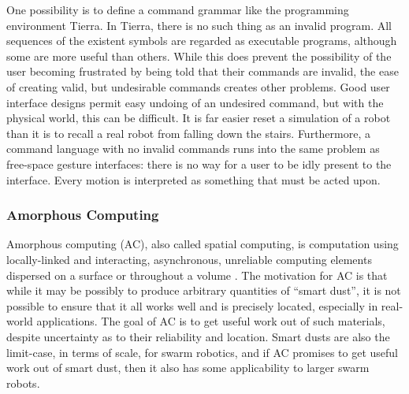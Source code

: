 \documentclass[]{article}
\begin{document}
One possibility is to define a command grammar like the programming environment Tierra. \cite{ray1991approach}
In Tierra, there is no such thing as an invalid program. 
All sequences of the existent symbols are regarded as executable programs, although some are more useful than others. 
While this does prevent the possibility of the user becoming frustrated by being told that their commands are invalid, the ease of creating valid, but undesirable commands creates other problems. 
Good user interface designs permit easy undoing of an undesired command, but with the physical world, this can be difficult. 
It is far easier reset a simulation of a robot than it is to recall a real robot from falling down the stairs. 
Furthermore, a command language with no invalid commands runs into the same problem as free-space gesture interfaces: there is no way for a user to be idly present to the interface.
Every motion is interpreted as something that must be acted upon. 

\subsubsection{Amorphous Computing}

Amorphous computing (AC), also called spatial computing, is computation using locally-linked and interacting, asynchronous, unreliable computing elements dispersed on a surface or throughout a volume \cite{abelson2000amorphous}. 
The motivation for AC is that while it may be possibly to produce arbitrary quantities of ``smart dust'', it is not possible to ensure that it all works well and is precisely located, especially in real-world applications.
The goal of AC is to get useful work out of such materials, despite uncertainty as to their reliability and location. 
Smart dusts are also the limit-case, in terms of scale, for swarm robotics, and if AC promises to get useful work out of smart dust, then it also has some applicability to larger swarm robots.
\end{document}
